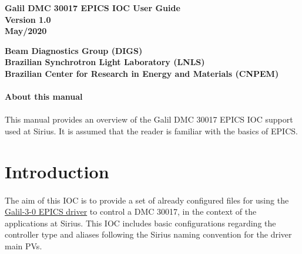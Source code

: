 \documentclass[openany]{article}
\begin{document}
\begin{titlepage}

\thispagestyle{fancy}

\begin{center}

\vspace*{\fill}
\textbf{\Huge Galil DMC 30017 EPICS IOC User Guide}\\[20pt]
\textbf{\Huge Version 1.0}\\[20pt]
\textbf{\Huge May/2020}
\vspace*{\fill}

\vfill
\textbf{Beam Diagnostics Group (DIGS)}\\[5pt]
\textbf{Brazilian Synchrotron Light Laboratory (LNLS)}\\[5pt]
\textbf{Brazilian Center for Research in Energy and Materials (CNPEM)}
\end{center}

\end{titlepage}

\newpage
\pagestyle{plain} %

\paragraph{}{\Large\bfseries About this manual}

\paragraph{} This manual provides an overview of the Galil DMC 30017 EPICS IOC support used at Sirius. It is assumed that the reader is familiar with the basics of EPICS.

\tableofcontents

\newpage
\section{Introduction}

\paragraph{} The aim of this IOC is to provide a set of already configured files for using the \href{https://github.com/motorapp/Galil-3-0}{Galil-3-0 EPICS driver} to control a DMC 30017, in the context of the applications at Sirius. This IOC includes basic configurations regarding the controller type and aliases following the Sirius naming convention for the driver main PVs.
\end{document}
